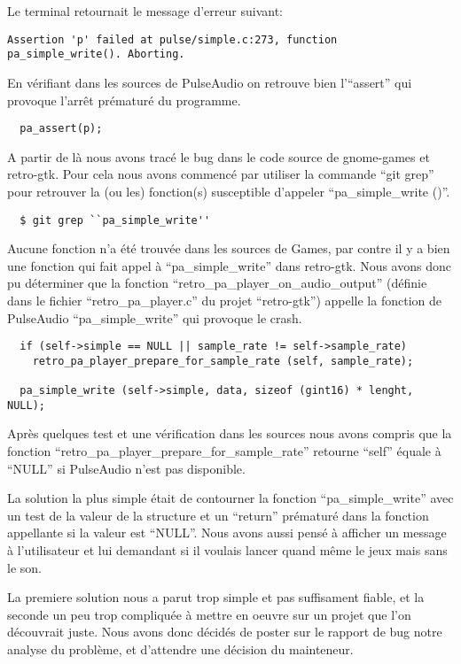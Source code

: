\documentclass[12pt]{report}
\begin{document}
Le terminal retournait le message d'erreur suivant:
\begin{verbatim}
Assertion 'p' failed at pulse/simple.c:273, function pa_simple_write(). Aborting.
\end{verbatim}

En vérifiant dans les sources de PulseAudio on retrouve bien l'``assert'' qui provoque
l’arrêt prématuré du programme.
\begin{verbatim}
  pa_assert(p);
\end{verbatim}

A partir de là nous avons tracé le bug dans le code source de gnome-games et retro-gtk.
Pour cela nous avons commencé par utiliser la commande ``git grep'' pour retrouver
la (ou les) fonction(s) susceptible d'appeler ``pa\_simple\_write ()''.
\begin{verbatim}
  $ git grep ``pa_simple_write''
\end{verbatim}

Aucune fonction n'a été trouvée dans les sources de Games, par contre il y a bien
une fonction qui fait appel à ``pa\_simple\_write'' dans retro-gtk.
Nous avons donc pu déterminer que la fonction
``retro\_pa\_player\_on\_audio\_output'' (définie dans le fichier
``retro\_pa\_player.c'' du projet ``retro-gtk'') appelle la fonction de PulseAudio
``pa\_simple\_write'' qui provoque le crash.

\begin{verbatim}
  if (self->simple == NULL || sample_rate != self->sample_rate)
    retro_pa_player_prepare_for_sample_rate (self, sample_rate);

  pa_simple_write (self->simple, data, sizeof (gint16) * lenght, NULL);
\end{verbatim}
  
Après quelques test et une vérification dans les sources nous  avons compris
que la fonction ``retro\_pa\_player\_prepare\_for\_sample\_rate'' retourne ``self''
équale à ``NULL'' si PulseAudio n'est pas disponible.

La solution la plus simple était de contourner la fonction ``pa\_simple\_write''
avec un test de la valeur de la structure et un ``return'' prématuré dans la fonction
appellante si la valeur est ``NULL''. Nous avons aussi pensé à afficher un message à
l'utilisateur et lui demandant si il voulais lancer quand même le jeux mais sans le son.

La premiere solution nous a parut trop simple et pas suffisament fiable, et la
seconde un peu trop compliquée à mettre en oeuvre sur un projet que l'on découvrait juste.
Nous avons donc décidés de poster sur le rapport de bug notre analyse du problème, et
d'attendre une décision du mainteneur.
\end{document}
